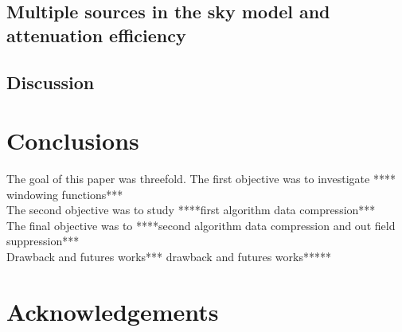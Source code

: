 \documentclass[useAMS,usenatbib]{mn2e}
\begin{document}
\subsection{Multiple sources in the sky model and attenuation efficiency}
\subsection{Discussion}
\section{Conclusions}
The goal of this paper was threefold. The first objective was to investigate **** windowing functions***\\
The second objective  was to study ****first algorithm data compression***\\
The final objective was to ****second algorithm data compression and out field suppression*** \\
Drawback and futures works*** drawback and futures works*****
\section*{Acknowledgements}


\appendix
\end{document}

